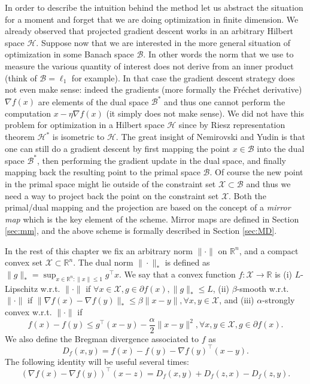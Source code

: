 \documentclass[openany]{now}
\newcommand{\R}{\mathbb{R}}
\newcommand{\cX}{\mathcal{X}}
\begin{document}
In order to describe the intuition behind the method let us abstract the situation for a moment and forget that we are doing optimization in finite dimension. We already observed that projected gradient descent works in an arbitrary Hilbert space $\mathcal{H}$. Suppose now that we are interested in the more general situation of optimization in some Banach space $\mathcal{B}$. In other words the norm that we use to measure the various quantity of interest does not derive from an inner product (think of $\mathcal{B} = \ell_1$ for example). In that case the gradient descent strategy does not even make sense: indeed the gradients (more formally the Fr\'echet derivative) $\nabla f(x)$ are elements of the dual space $\mathcal{B}^*$ and thus one cannot perform the computation $x - \eta \nabla f(x)$ (it simply does not make sense). We did not have this problem for optimization in a Hilbert space $\mathcal{H}$ since by Riesz representation theorem $\mathcal{H}^*$ is isometric to $\mathcal{H}$. The great insight of Nemirovski and Yudin is that one can still do a gradient descent by first mapping the point $x \in \mathcal{B}$ into the dual space $\mathcal{B}^*$, then performing the gradient update in the dual space, and finally mapping back the resulting point to the primal space $\mathcal{B}$. Of course the new point in the primal space might lie outside of the constraint set $\mathcal{X} \subset \mathcal{B}$ and thus we need a way to project back the point on the constraint set $\mathcal{X}$. Both the primal/dual mapping and the projection are based on the concept of a {\em mirror map} which is the key element of the scheme. Mirror maps are defined in Section \ref{sec:mm}, and the above scheme is formally described in Section \ref{sec:MD}.

In the rest of this chapter we fix an arbitrary norm $\|\cdot\|$ on $\R^n$, and a compact convex set $\cX \subset \R^n$. The dual norm $\|\cdot\|_*$ is defined as $\|g\|_* = \sup_{x \in \mathbb{R}^n : \|x\| \leq 1} g^{\top} x$. We say that a convex function $f : \cX \rightarrow \R$ is (i) $L$-Lipschitz w.r.t. $\|\cdot\|$ if $\forall x \in \cX, g \in \partial f(x), \|g\|_* \leq L$, (ii) $\beta$-smooth w.r.t. $\|\cdot\|$ if $\|\nabla f(x) - \nabla f(y) \|_* \leq \beta \|x-y\|, \forall x, y \in \cX$, and (iii) $\alpha$-strongly convex w.r.t. $\|\cdot\|$ if 
$$f(x) - f(y) \leq g^{\top} (x - y) - \frac{\alpha}{2} \|x - y \|^2 , \forall x, y \in \cX, g \in \partial f(x).$$ We also define the Bregman divergence associated to $f$ as 
$$D_{f}(x,y) = f(x) - f(y) - \nabla f(y)^{\top} (x - y) .$$
The following identity will be useful several times:
\begin{equation} \label{eq:useful1}
(\nabla f(x) - \nabla f(y))^{\top}(x-z) = D_{f}(x,y) + D_{f}(z,x) - D_{f}(z,y) .
\end{equation}
\end{document}
